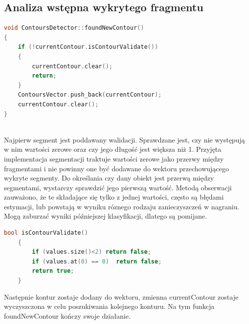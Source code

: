 \documentclass[a4paper,12 pt]{report}
\begin{document}
\subsection{Analiza wstępna wykrytego fragmentu}
\begin{lstlisting}[caption={Funkcja zajmująca się analizą wstępną wykrytego segmentu},label={lst:label},language=C++]
void ContoursDetector::foundNewContour()
{
    if (!currentContour.isContourValidate())
    {
        currentContour.clear();
        return;
    }
    ContoursVector.push_back(currentContour);
    currentContour.clear();
}    
                
\end{lstlisting}
Najpierw segment jest poddawany walidacji. Sprawdzane jest, czy nie występują w nim wartości zerowe oraz czy jego długość jest większa niż 1. Przyjęta implementacja segmentacji traktuje wartości zerowe jako przerwy między fragmentami i nie powinny one być dodawane do wektoru przechowującego wykryte segmenty. Do określania czy dany obiekt jest przerwą między segmentami, wystarczy sprawdzić jego pierwszą wartość.
Metodą obserwacji zauważono, że te składające się tylko z jednej wartości, często są błędami estymacji, lub powstają w wyniku róznego rodzaju zanieczyszczeń w nagraniu. Mogą zaburzać wyniki późniejszej klasyfikacji, dlatego są pomijane.
\begin{lstlisting}[caption={Funkcja dokonująca walidacji segmentu},label={lst:label},language=C++]
    bool isContourValidate()
    {
        if (values.size()<2) return false;
        if (values.at(0) == 0)  return false;
        return true;
    }
\end{lstlisting}

Następnie kontur zostaje dodany do wektoru,  zmienna currentContour zostaje wyczyszczona w celu poszukiwania kolejnego konturu. Na tym funkcja foundNewContour kończy swoje działanie.
\end{document}
